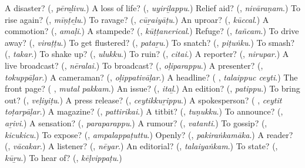 \begin{tcolorbox}[breakable,colback=teal!4,colframe=teal!35!black,title={Before you move on}]
A disaster? (\textbf{}, \emph{pēraḻivu}.) A loss of life? (\textbf{}, \emph{uyiriḻappu}.) Relief aid? (\textbf{}, \emph{nivāraṇam}.) To rise again? (\textbf{}, \emph{mīṇṭeḻu}.) To ravage? (\textbf{}, \emph{cūṟaiyāṭu}.) An uproar? (\textbf{}, \emph{kūccal}.) A commotion? (\textbf{}, \emph{amaḷi}.) A stampede? (\textbf{}, \emph{kūṭṭanerical}.) Refuge? (\textbf{}, \emph{tañcam}.) To drive away? (\textbf{}, \emph{viraṭṭu}.) To get flustered? (\textbf{}, \emph{pataṟu}.) To snatch? (\textbf{}, \emph{piṭuṅku}.) To smash? (\textbf{}, \emph{takar}.) To shake up? (\textbf{}, \emph{ulukku}.) To ruin? (\textbf{}, \emph{citai}.) A reporter? (\textbf{}, \emph{nirupar}.) A live broadcast? (\textbf{}, \emph{nēralai}.) To broadcast? (\textbf{}, \emph{oḷiparappu}.) A presenter? (\textbf{}, \emph{tokuppāḷar}.) A cameraman? (\textbf{}, \emph{oḷippativāḷar}.) A headline? (\textbf{ }, \emph{talaippuc ceyti}.) The front page? (\textbf{ }, \emph{mutal pakkam}.) An issue? (\textbf{}, \emph{itaḻ}.) An edition? (\textbf{}, \emph{patippu}.) To bring out? (\textbf{}, \emph{veḷiyiṭu}.) A press release? (\textbf{}, \emph{ceytikkuṟippu}.) A spokesperson? (\textbf{ }, \emph{ceytit toṭarpāḷar}.) A magazine? (\textbf{}, \emph{pattirikai}.) A titbit? (\textbf{}, \emph{tuṇukku}.) To announce? (\textbf{}, \emph{aṟivi}.) A sensation? (\textbf{}, \emph{paraparappu}.) A rumour? (\textbf{}, \emph{vatanti}.) To gossip? (\textbf{}, \emph{kicukicu}.) To expose? (\textbf{}, \emph{ampalappaṭuttu}.) Openly? (\textbf{}, \emph{pakiraṅkamāka}.) A reader? (\textbf{}, \emph{vācakar}.) A listener? (\textbf{}, \emph{nēyar}.) An editorial? (\textbf{}, \emph{talaiyaṅkam}.) To state? (\textbf{}, \emph{kūṟu}.) To hear of? (\textbf{}, \emph{kēḷvippaṭu}.)
\end{tcolorbox}
